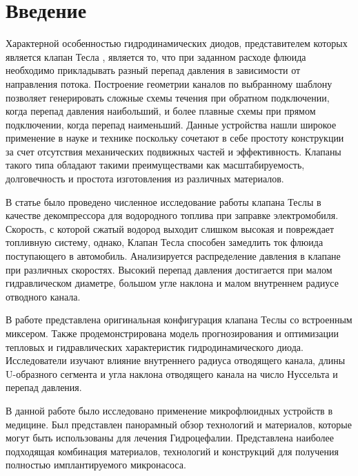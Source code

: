 \documentclass[10pt,a4paper]{book}
\begin{document}
    \MakeArticleHeader
    
    \section{Введение}\label{p:vved}
    Характерной особенностью гидродинамических диодов, представителем которых является клапан Тесла \cite{TeslaValveReview}, является то, что при заданном расходе флюида необходимо прикладывать разный перепад давления в зависимости от направления потока. Построение геометрии каналов по выбранному шаблону позволяет генерировать сложные схемы течения при обратном подключении, когда перепад давления наибольший, и более плавные схемы при прямом подключении, когда перепад наименьший. Данные устройства нашли широкое применение в науке и технике поскольку сочетают в себе простоту конструкции за счет отсутствия механических подвижных частей и эффективность. Клапаны такого типа обладают такими преимуществами как масштабируемость, долговечность и простота изготовления из различных материалов.
    
    В статье \cite{JIN20188888} было проведено численное исследование работы клапана Теслы в качестве декомпрессора для водородного топлива при заправке электромобиля. Скорость, с которой сжатый водород выходит слишком высокая и повреждает топливную систему, однако, Клапан Тесла способен замедлить ток флюида поступающего в автомобиль. Анализируется распределение давления в клапане при различных скоростях. Высокий перепад давления достигается при малом гидравлическом диаметре, большом угле наклона и малом внутреннем радиусе отводного канала. 
    
    В работе \cite{DU2023103670} представлена оригинальная конфигурация клапана Теслы со встроенным миксером. Также продемонстрирована модель прогнозирования и оптимизации тепловых и гидравлических характеристик гидродинамического диода. Исследователи изучают влияние внутреннего радиуса отводящего канала, длины U-образного сегмента и угла наклона отводящего канала на число Нуссельта и перепад давления.
    
    В данной работе \cite{article} было исследовано применение микрофлюидных устройств в медицине. Был представлен панорамный обзор технологий и материалов, которые могут быть использованы для лечения Гидроцефалии. Представлена наиболее подходящая комбинация материалов, технологий и конструкций для получения полностью имплантируемого микронасоса. 
    
\end{document}
